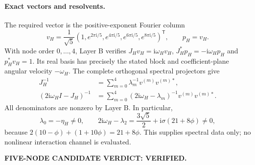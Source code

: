 \documentclass[11pt]{article}
\newcommand{\ii}{\mathrm i}
\begin{document}
\paragraph{Exact vectors and resolvents.}
The required vector is the positive-exponent Fourier column
\[
 v_H=\frac1{\sqrt5}(1,e^{2\pi\ii/5},e^{4\pi\ii/5},
 e^{6\pi\ii/5},e^{8\pi\ii/5})^{\mathsf T},\qquad p_H=v_H.
\]
With node order $0,\ldots,4$, Layer B verifies
$J_Hv_H=\ii\omega_Hv_H$, $J_H^*p_H=-\ii\omega_Hp_H$ and
$p_H^*v_H=1$. Its real basis has precisely the stated block and
coefficient-plane angular velocity $-\omega_H$.
The complete orthogonal spectral projectors give
\begin{align*}
 J_H^{-1}&=\sum_{m=0}^4\lambda_m^{-1}v^{(m)}v^{(m)*},\\
 (2\ii\omega_H I-J_H)^{-1}
 &=\sum_{m=0}^4(2\ii\omega_H-\lambda_m)^{-1}v^{(m)}v^{(m)*}.
\end{align*}
All denominators are nonzero by Layer B. In particular,
\[
 \lambda_0=-\eta_H\ne0,\qquad
 2\ii\omega_H-\lambda_2
 =\frac{3\sqrt5}{2}+\ii\sigma(21+8\phi)\ne0,
\]
because $2(10-\phi)+(1+10\phi)=21+8\phi$. This supplies spectral
data only; no nonlinear interaction channel is evaluated.

\noindent\textbf{FIVE-NODE CANDIDATE VERDICT: VERIFIED.}
\end{document}
